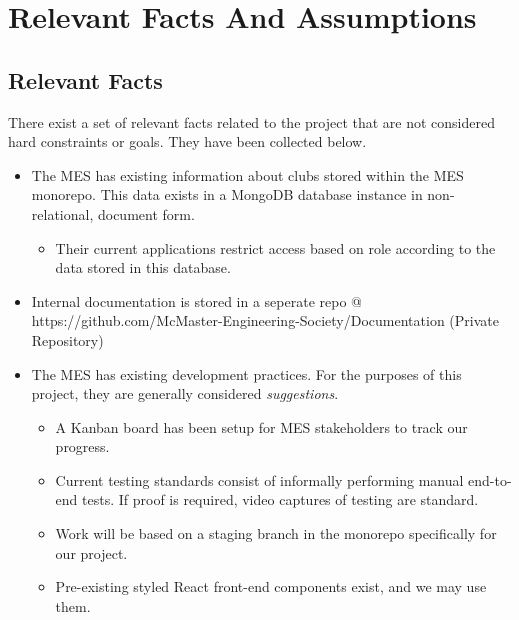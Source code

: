\documentclass[12pt]{article}
\begin{document}
\section{Relevant Facts And Assumptions}
  \subsection{Relevant Facts}
  There exist a set of relevant facts related to the project that are not considered hard constraints or goals. They have been collected below.

  \begin{itemize}
    \item The MES has existing information about clubs stored within the MES monorepo. This data exists in a MongoDB database instance in non-relational, document form.
      \begin{itemize}
        \item Their current applications restrict access based on role according to the data stored in this database.
      \end{itemize}
    \item Internal documentation is stored in a seperate repo @ https://github.com/McMaster-Engineering-Society/Documentation (Private Repository)
    \item The MES has existing development practices. For the purposes of this project, they are generally considered \textit{suggestions}.
      \begin{itemize}
        \item A Kanban board has been setup for MES stakeholders to track our progress.
        \item Current testing standards consist of informally performing manual end-to-end tests. If proof is required, video captures of testing are standard.
        \item Work will be based on a staging branch in the monorepo specifically for our project.
        \item Pre-existing styled React front-end components exist, and we may use them. 
      \end{itemize} 
  \end{itemize}
\end{document}
